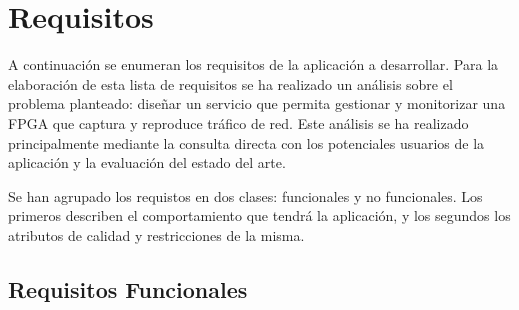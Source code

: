 \chapter{Requisitos\label{cap:requisitos}}

A continuación se enumeran los requisitos de la aplicación a desarrollar. Para la elaboración de esta lista de requisitos se ha realizado un análisis sobre el problema planteado: diseñar un servicio que permita gestionar y monitorizar una \gls{FPGA} que captura y reproduce tráfico de red. Este análisis se ha realizado principalmente mediante la consulta directa con los potenciales usuarios de la aplicación y la evaluación del estado del arte.

Se han agrupado los requistos en dos clases: funcionales y no funcionales. Los primeros describen el comportamiento que tendrá la aplicación, y los segundos los atributos de calidad y restricciones de la misma.


\section{Requisitos Funcionales\label{sec:req:rf}}

